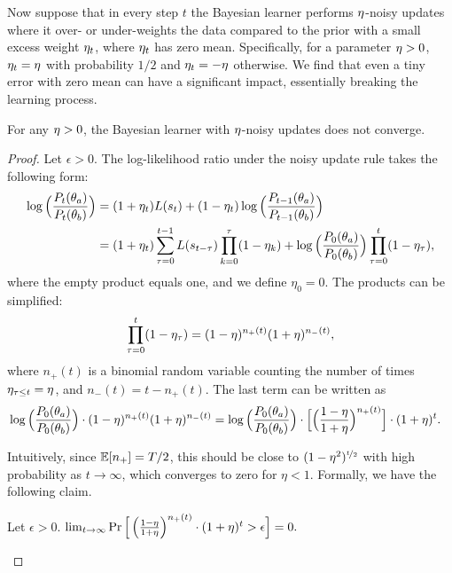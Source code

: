 Now suppose that in every step $t$ the Bayesian learner performs $\eta$-noisy updates where it over- or under-weights the data compared to the prior with a small excess weight $\eta_t$, where $\eta_t$ has zero mean. Specifically, for a parameter $\eta > 0$, $\eta_t= \eta$ with probability $1/2$ and $\eta_t = -\eta$ otherwise. 
We find that even a tiny error with zero mean can have a significant impact, essentially breaking the learning process.

\begin{theorem}\label{thm:wrong-update-Bayesians-vanish}
    For any $\eta > 0$, the Bayesian learner with $\eta$-noisy updates does not converge. 
\end{theorem}

\begin{proof}
Let $\epsilon > 0$. 
The log-likelihood ratio under the noisy update rule takes the following form:
\begin{align}\label{eq:inacurate-update-log-ratio}
    \log\Big(
    \frac{P_t(\theta_a)}{P_t(\theta_b)}
    \Big) 
    &=  
    (1 + \eta_t) L(s_t) + 
    (1 - \eta_t) \log \Big(\frac{P_{t-1}(\theta_a)}{P_{t-1}(\theta_b)}\Big) \nonumber \\
    &= 
    (1 + \eta_t)\sum_{\tau=0}^{t-1} L(s_{t - \tau}) \prod_{k=0}^\tau (1 - \eta_k)  
     + 
    \log\Big(
    \frac{P_0(\theta_a)}{P_0(\theta_b)}
    \Big)
    \prod_{\tau=0}^t
    (1 - \eta_{\tau}),
\end{align}
where the empty product equals one, and we define $\eta_0 = 0$.
The products can be simplified:
\begin{align*}
    \prod_{\tau=0}^t
    (1 - \eta_\tau)  = 
    (1 - \eta)^{n_+(t)}
    (1 + \eta)^{n_-(t)},
\end{align*}
where $n_+(t)$ is a binomial random variable counting the number of times $\eta_{\tau \leq t} = \eta$, and $n_-(t) = t - n_+(t)$. 
The last term can be written as  
\begin{align*}
    &
    \log\Big(
    \frac{P_0(\theta_a)}{P_0(\theta_b)}
    \Big)
    \cdot 
    (1 - \eta)^{n_+(t)}
    (1 + \eta)^{n_-(t)} 
    = 
    \log\Big(
    \frac{P_0(\theta_a)}{P_0(\theta_b)}
    \Big)
    \cdot 
    \Big[
    \Big(
    \frac{1 - \eta}
    {1 + \eta}\Big)^{n_+(t)}
    \Big] \cdot
    (1 + \eta)^t.
\end{align*}

Intuitively, since $\operatorname{\mathbb{E}}[n_+] = T/2$, this should be close to $(1 - \eta^2)^{\nicefrac{t}{2}}$ with high probability as $t \rightarrow \infty$, which converges to zero for $\eta < 1$. Formally, we have the following claim.
    \begin{claim}
        Let $\epsilon > 0$.
        $
        \lim_{t \rightarrow \infty} \Pr \Big[ \left(\frac{1 - \eta}{1 + \eta}\right)^{n_+(t)} \cdot (1 + \eta)^t > \epsilon \Big] = 0.
        $
    \end{claim}
    

\end{proof}
